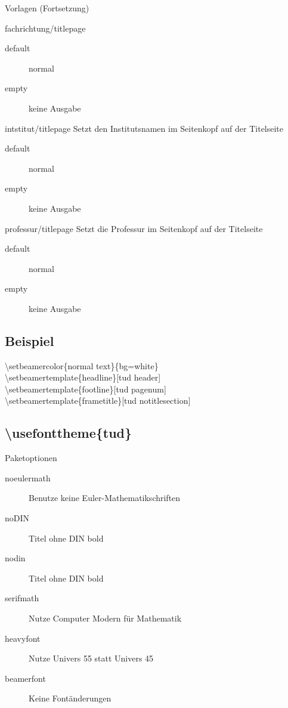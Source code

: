 \documentclass[presentation,t]{beamer}
\begin{document}
\begin{frame}[label=sec-2-2-5]{Vorlagen (Fortsetzung)}
\begin{block}{fachrichtung/titlepage}
\begin{description}
\item[{default}] normal
\item[{empty}] keine Ausgabe
\end{description}
\end{block}
\begin{block}{intstitut/titlepage}
Setzt den Institutsnamen im Seitenkopf auf der Titelseite

\begin{description}
\item[{default}] normal
\item[{empty}] keine Ausgabe
\end{description}
\end{block}

\begin{block}{professur/titlepage}
Setzt die Professur im Seitenkopf auf der Titelseite

\begin{description}
\item[{default}] normal
\item[{empty}] keine Ausgabe
\end{description}
\end{block}
\end{frame}

\subsection{Beispiel}
\label{sec-2-3}

\textbackslash setbeamercolor\{normal text\}\{bg=white\}\\
\textbackslash setbeamertemplate\{headline\}[tud header]\\
\textbackslash setbeamertemplate\{footline\}[tud pagenum]\\
\textbackslash setbeamertemplate\{frametitle\}[tud notitlesection]\\


\subsection{\textbackslash usefonttheme\{tud\}}
\label{sec-2-4}

\begin{frame}[label=sec-2-4-1]{Paketoptionen}
\begin{description}
\item[{noeulermath}] Benutze keine Euler-Mathematikschriften
\item[{noDIN}] Titel ohne DIN bold
\item[{nodin}] Titel ohne DIN bold
\item[{serifmath}] Nutze Computer Modern für Mathematik
\item[{heavyfont}] Nutze Univers 55 statt Univers 45
\item[{beamerfont}] Keine Fontänderungen
\end{description}
\end{frame}
\end{document}
